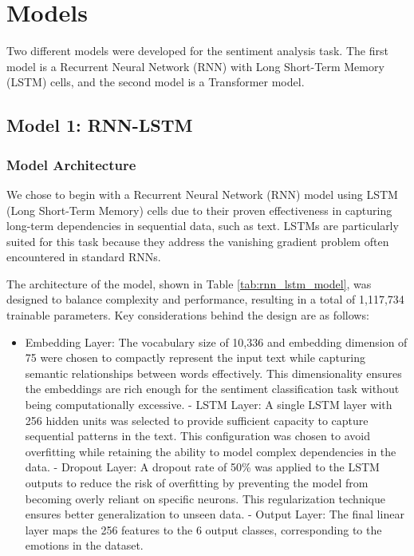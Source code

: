 \section{Models}
Two different models were developed for the sentiment analysis task. The first model is a Recurrent Neural Network (RNN) with Long Short-Term Memory (LSTM) cells, and the second model is a Transformer model.

\subsection{Model 1: RNN-LSTM}
\subsubsection{Model Architecture}
We chose to begin with a Recurrent Neural Network (RNN) model using LSTM (Long Short-Term Memory) cells due to their proven effectiveness in capturing long-term dependencies in sequential data, such as text. LSTMs are particularly suited for this task because they address the vanishing gradient problem often encountered in standard RNNs.

The architecture of the model, shown in Table \ref{tab:rnn_lstm_model}, was designed to balance complexity and performance, resulting in a total of 1,117,734 trainable parameters. Key considerations behind the design are as follows:
\begin{itemize}
    \item Embedding Layer: The vocabulary size of 10,336 and embedding dimension of 75 were chosen to compactly represent the input text while capturing semantic relationships between words effectively. This dimensionality ensures the embeddings are rich enough for the sentiment classification task without being computationally excessive.
          - LSTM Layer: A single LSTM layer with 256 hidden units was selected to provide sufficient capacity to capture sequential patterns in the text. This configuration was chosen to avoid overfitting while retaining the ability to model complex dependencies in the data.
          - Dropout Layer: A dropout rate of 50\% was applied to the LSTM outputs to reduce the risk of overfitting by preventing the model from becoming overly reliant on specific neurons. This regularization technique ensures better generalization to unseen data.
          - Output Layer: The final linear layer maps the 256 features to the 6 output classes, corresponding to the emotions in the dataset.
\end{itemize}

